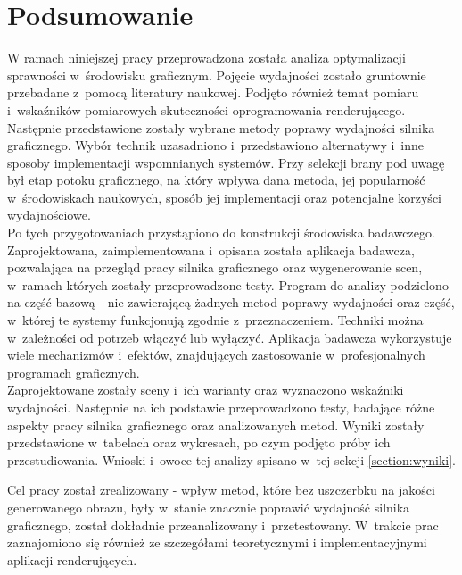 \documentclass[a4paper,twoside,12pt]{book}
\begin{document}
\chapter{Podsumowanie}

W ramach niniejszej pracy przeprowadzona została analiza optymalizacji sprawności w~środowisku graficznym. Pojęcie wydajności zostało gruntownie przebadane z~pomocą literatury naukowej. Podjęto również temat pomiaru i~wskaźników pomiarowych skuteczności oprogramowania renderującego. \\
Następnie przedstawione zostały wybrane metody poprawy wydajności silnika graficznego. Wybór technik uzasadniono i~przedstawiono alternatywy i~inne sposoby implementacji wspomnianych systemów. Przy selekcji brany pod uwagę był etap potoku graficznego, na który wpływa dana metoda, jej popularność w~środowiskach naukowych, sposób jej implementacji oraz potencjalne korzyści wydajnościowe. \\
Po tych przygotowaniach przystąpiono do konstrukcji środowiska badawczego. Zaprojektowana, zaimplementowana i~opisana została aplikacja badawcza, pozwalająca na przegląd pracy silnika graficznego oraz wygenerowanie scen, w~ramach których zostały przeprowadzone testy. Program do analizy podzielono na część bazową - nie zawierającą żadnych metod poprawy wydajności oraz część, w~której te systemy funkcjonują zgodnie z~przeznaczeniem. Techniki można w~zależności od potrzeb włączyć lub wyłączyć. Aplikacja badawcza wykorzystuje wiele mechanizmów i~efektów, znajdujących zastosowanie w~profesjonalnych programach graficznych. \\
Zaprojektowane zostały sceny i~ich warianty oraz wyznaczono wskaźniki wydajności. Następnie na ich podstawie przeprowadzono testy, badające różne aspekty pracy silnika graficznego oraz analizowanych metod. Wyniki zostały przedstawione w~tabelach oraz wykresach, po czym podjęto próby ich przestudiowania. Wnioski i~owoce tej analizy spisano w~tej sekcji \ref{section:wyniki}.

\vbox{}

Cel pracy został zrealizowany - wpływ metod, które bez uszczerbku na jakości generowanego obrazu, były w~stanie znacznie poprawić wydajność silnika graficznego, został dokładnie przeanalizowany i~przetestowany. W~trakcie prac zaznajomiono się również ze szczegółami teoretycznymi i implementacyjnymi aplikacji renderujących.
\end{document}
